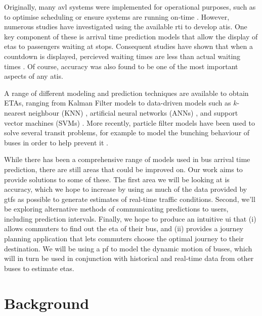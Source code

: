 \documentclass[12pt,a4paper]{article}
\begin{document}
Originally, many \gls{avl} systems were implemented for operational purposes, 
such as to optimise scheduling or ensure systems are running on-time \citep{tcrp:2003}.
However, numerous studies have investigated using the available \gls{rti} to develop \gls{atis}.
One key component of these is arrival time prediction models that allow 
the display of \glspl{eta} to passengers waiting at stops.
Consequent studies have shown that when a countdown is displayed, 
percieved waiting times are less than actual waiting times \citep{tcrp:2003b}.
Of course, accuracy was also found to be one of the most important aspects of any \gls{atis}.


A range of different modeling and prediction techniques are available to obtain ETAs,
ranging from Kalman Filter models 
to data-driven models such as 
$k$-nearest neighbour (KNN) \citep{cn}, 
artificial neural networks (ANNs) \citep{cn}, 
and support vector machines (SVMs) \citep{cn}.
More recently, particle filter models have been used to solve several transit problems,
for example to model the bunching behaviour of buses in order to help prevent it
\citep{hans-etal:2015}.


While there has been a comprehensive range of models used in bus arrival time prediction, 
there are still areas that could be improved on.
Our work aims to provide solutions to some of these.
The first area we will be looking at is accuracy,
which we hope to increase by using as much of the data provided by \gls{gtfs} as possible 
to generate estimates of real-time traffic conditions.
Second, we'll be exploring alternative methods of communicating predictions to users, 
including prediction intervals.
Finally, we hope to produce an intuitive \gls{ui} that 
(i) allows commuters to find out the \gls{eta} of their bus, 
and (ii) provides a journey planning application that lets commuters choose 
the optimal journey to their destination.
We will be using a \gls{pf} to model the dynamic motion of buses, 
which will in turn be used in conjunction with historical and real-time data 
from other buses to estimate \glspl{eta}.



\section{Background}
\label{sec:background}


\end{document}
